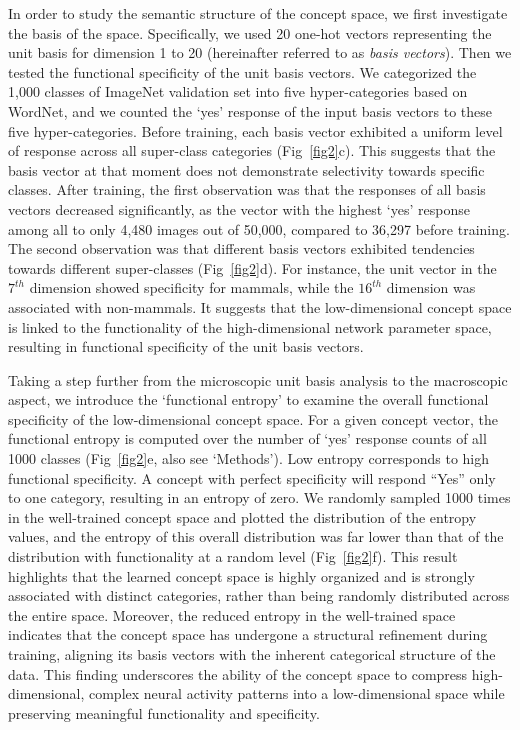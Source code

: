 \documentclass[pdflatex,sn-mathphys-num,lineno]{sn-jnl}%
\begin{document}
\begin{CJK}{UTF8}{gbsn}
In order to study the semantic structure of the concept space, we first investigate the basis of the space. Specifically, we used 20 one-hot vectors representing the unit basis for dimension 1 to 20 (hereinafter referred to as \textit{basis vectors}). Then we tested the functional specificity of the unit basis vectors. We categorized the 1,000 classes of ImageNet validation set into five hyper-categories based on WordNet, and we counted the ‘yes’ response of the input basis vectors to these five hyper-categories. Before training, each basis vector exhibited a uniform level of response across all super-class categories (Fig~\ref{fig2}c). This suggests that the basis vector at that moment does not demonstrate selectivity towards specific classes. After training, the first observation was that the responses of all basis vectors decreased significantly, as the vector with the highest ‘yes’ response among all to only 4,480 images out of 50,000, compared to 36,297 before training. The second observation was that different basis vectors exhibited tendencies towards different super-classes (Fig~\ref{fig2}d). For instance, the unit vector in the $7^{th}$ dimension showed specificity for mammals, while the $16^{th}$ dimension was associated with non-mammals. It suggests that the low-dimensional concept space is linked to the functionality of the high-dimensional network parameter space, resulting in functional specificity of the unit basis vectors. 

Taking a step further from the microscopic unit basis analysis to the macroscopic aspect, we introduce the ‘functional entropy’ to examine the overall functional specificity of the low-dimensional concept space. For a given concept vector, the functional entropy is computed over the number of ‘yes’ response counts of all 1000 classes (Fig~\ref{fig2}e, also see ‘Methods’). Low entropy corresponds to high functional specificity. A concept with perfect specificity will respond “Yes” only to one category, resulting in an entropy of zero. We randomly sampled 1000 times in the well-trained concept space and plotted the distribution of the entropy values, and the entropy of this overall distribution was far lower than that of the distribution with functionality at a random level (Fig~\ref{fig2}f). This result highlights that the learned concept space is highly organized and is strongly associated with distinct categories, rather than being randomly distributed across the entire space. Moreover, the reduced entropy in the well-trained space indicates that the concept space has undergone a structural refinement during training, aligning its basis vectors with the inherent categorical structure of the data. This finding underscores the ability of the concept space to compress high-dimensional, complex neural activity patterns into a low-dimensional space while preserving meaningful functionality and specificity.


\end{CJK}
\end{document}

